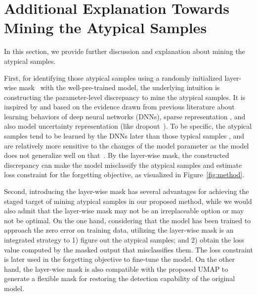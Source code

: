 \documentclass{article}
\theoremstyle{plain}
\theoremstyle{definition}
\theoremstyle{remark}
\begin{document}
\section{Additional Explanation Towards Mining the Atypical Samples}
\label{app:atypical_mining}

In this section, we provide further discussion and explanation about mining the atypical samples.

First, for identifying those atypical samples using a randomly initialized layer-wise mask~\citep{ramanujan2020s} with the well-pre-trained model, the underlying intuition is constructing the parameter-level discrepancy to mine the atypical samples. It is inspired by and based on the evidence drawn from previous literature about learning behaviors \citep{arpit2017closer,goodfellow2016deep} of deep neural networks (DNNs), sparse representation \citep{DBLP:journals/corr/abs-1803-03635,10.1007/978-3-642-42051-1_16,barham2022pathways}, and also model uncertainty representation (like dropout~\citep{gal2016dropout}). To be specific, the atypical samples tend to be learned by the DNNs later than those typical samples \citep{arpit2017closer}, and are relatively more sensitive to the changes of the model parameter as the model does not generalize well on that~\citep{booktitles_jmlr_dropout,gal2016dropout}. By the layer-wise mask, the constructed discrepancy can make the model misclassify the atypical samples and estimate loss constraint for the forgetting objective, as visualized in Figure~\ref{fig:method}.

Second, introducing the layer-wise mask has several advantages for achieving the staged target of mining atypical samples in our proposed method, while we would also admit that the layer-wise mask may not be an irreplaceable option or may not be optimal. On the one hand, considering that the model has been trained to approach the zero error on training data, utilizing the layer-wise mask is an integrated strategy to 1) figure out the atypical samples; and 2) obtain the loss value computed by the masked output that misclassifies them. The loss constraint is later used in the forgetting objective to fine-tune the model. On the other hand, the layer-wise mask is also compatible with the proposed UMAP to generate a flexible mask for restoring the detection capability of the original model.
\end{document}

